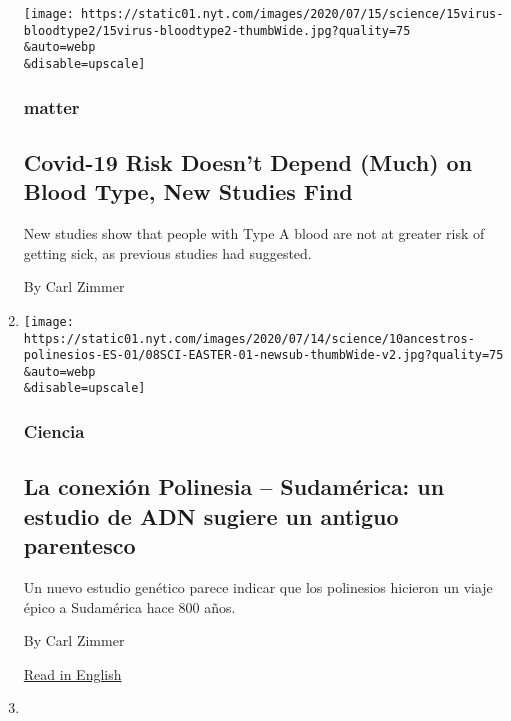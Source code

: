 \begin{enumerate}
  \texttt{[image: https://static01.nyt.com/images/2020/07/15/science/15virus-bloodtype2/15virus-bloodtype2-thumbWide.jpg?quality=75\\\&auto=webp\\\&disable=upscale]}

  \hypertarget{matter}{%
  \subsubsection{matter}\label{matter}}

  \hypertarget{covid-19-risk-doesnt-depend-much-on-blood-type-new-studies-find}{%
  \subsection{Covid-19 Risk Doesn't Depend (Much) on Blood Type, New
  Studies
  Find}\label{covid-19-risk-doesnt-depend-much-on-blood-type-new-studies-find}}

  New studies show that people with Type A blood are not at greater risk
  of getting sick, as previous studies had suggested.

  By Carl Zimmer
\item
  \href{/es/2020/07/10/espanol/ciencia-y-tecnologia/polinesios-estudio-genetico.html}{}

  \texttt{[image: https://static01.nyt.com/images/2020/07/14/science/10ancestros-polinesios-ES-01/08SCI-EASTER-01-newsub-thumbWide-v2.jpg?quality=75\\\&auto=webp\\\&disable=upscale]}

  \hypertarget{ciencia}{%
  \subsubsection{Ciencia}\label{ciencia}}

  \hypertarget{la-conexiuxf3n-polinesia--sudamuxe9rica-un-estudio-de-adn-sugiere-un-antiguo-parentesco}{%
  \subsection{La conexión Polinesia -- Sudamérica: un estudio de ADN
  sugiere un antiguo
  parentesco}\label{la-conexiuxf3n-polinesia--sudamuxe9rica-un-estudio-de-adn-sugiere-un-antiguo-parentesco}}

  Un nuevo estudio genético parece indicar que los polinesios hicieron
  un viaje épico a Sudamérica hace 800 años.

  By Carl Zimmer

  \href{https://www.nytimes.com/2020/07/08/science/polynesian-ancestry.html}{Read
  in English}
\item
  \href{/2020/07/08/science/polynesian-ancestry.html}{}


\end{enumerate}
